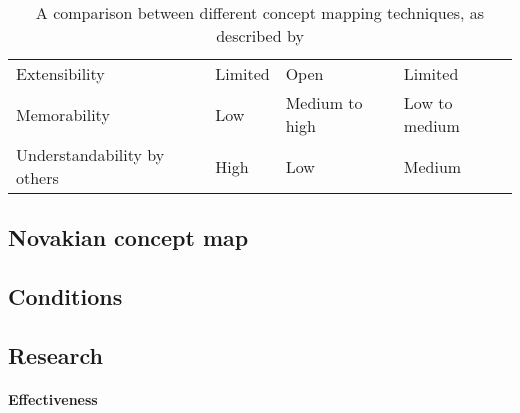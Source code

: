 \begin{table}[]
\begin{tabular}{p{}p{}p{}p{}}
                Extensibility                     & Limited                                                                                                                             & Open                                                                                                                                                & Limited                                                                                                                                        \\
                Memorability                      & Low                                                                                                                                 & Medium to high                                                                                                                                      & Low to medium                                                                                                                                  \\
                Understandability by others       & High                                                                                                                                & Low                                                                                                                                                 & Medium                                                                                                                                         \\ \hline
            \end{tabular}
            \caption{A comparison between different concept mapping techniques, as described by \protect{}}
            \label{tab:vmtechs}
        \end{table}

        \subsection{Novakian concept map}

        \subsection{Conditions}

        \subsection{Research}

            \paragraph{Effectiveness}

